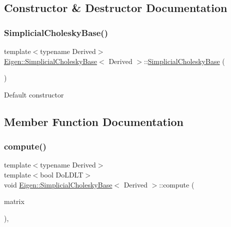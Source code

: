 \subsection{Constructor \& Destructor Documentation}
\mbox{\label{class_eigen_1_1_simplicial_cholesky_base_a098baba1dbe07ca3a775c8df1f8a0e71}} 
\subsubsection{\texorpdfstring{SimplicialCholeskyBase()}{SimplicialCholeskyBase()}}
{\footnotesize\ttfamily template$<$typename Derived$>$ \\
\mbox{\hyperlink{class_eigen_1_1_simplicial_cholesky_base}{Eigen\+::\+Simplicial\+Cholesky\+Base}}$<$ Derived $>$\+::\mbox{\hyperlink{class_eigen_1_1_simplicial_cholesky_base}{Simplicial\+Cholesky\+Base}} (\begin{DoxyParamCaption}{ }\end{DoxyParamCaption})\hspace{0.3cm}{\ttfamily [inline]}}

Default constructor 

\subsection{Member Function Documentation}
\mbox{\label{class_eigen_1_1_simplicial_cholesky_base_a9a741744dda2261cae26cddf96a35bf0}} 
\subsubsection{\texorpdfstring{compute()}{compute()}}
{\footnotesize\ttfamily template$<$typename Derived$>$ \\
template$<$bool Do\+L\+D\+LT$>$ \\
void \mbox{\hyperlink{class_eigen_1_1_simplicial_cholesky_base}{Eigen\+::\+Simplicial\+Cholesky\+Base}}$<$ Derived $>$\+::compute (\begin{DoxyParamCaption}\item[{const Matrix\+Type \&}]{matrix }\end{DoxyParamCaption})\hspace{0.3cm}{\ttfamily [inline]}, {\ttfamily [protected]}}

